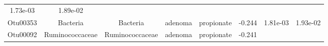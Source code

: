 \documentclass[11pt,]{article}
\begin{document}
\begin{longtable}[]{@{}cccccccc@{}}
\begin{minipage}[t]{0.08\columnwidth}
1.73e-03\strut
\end{minipage} & \begin{minipage}[t]{0.08\columnwidth}\centering\strut
1.89e-02\strut
\end{minipage}\tabularnewline
\begin{minipage}[t]{0.08\columnwidth}\centering\strut
Otu00353\strut
\end{minipage} & \begin{minipage}[t]{0.15\columnwidth}\centering\strut
Bacteria\strut
\end{minipage} & \begin{minipage}[t]{0.15\columnwidth}\centering\strut
Bacteria\strut
\end{minipage} & \begin{minipage}[t]{0.08\columnwidth}\centering\strut
adenoma\strut
\end{minipage} & \begin{minipage}[t]{0.09\columnwidth}\centering\strut
propionate\strut
\end{minipage} & \begin{minipage}[t]{0.07\columnwidth}\centering\strut
-0.244\strut
\end{minipage} & \begin{minipage}[t]{0.08\columnwidth}\centering\strut
1.81e-03\strut
\end{minipage} & \begin{minipage}[t]{0.08\columnwidth}\centering\strut
1.93e-02\strut
\end{minipage}\tabularnewline
\begin{minipage}[t]{0.08\columnwidth}\centering\strut
Otu00092\strut
\end{minipage} & \begin{minipage}[t]{0.15\columnwidth}\centering\strut
Ruminococcaceae\strut
\end{minipage} & \begin{minipage}[t]{0.15\columnwidth}\centering\strut
Ruminococcaceae\strut
\end{minipage} & \begin{minipage}[t]{0.08\columnwidth}\centering\strut
adenoma\strut
\end{minipage} & \begin{minipage}[t]{0.09\columnwidth}\centering\strut
propionate\strut
\end{minipage} & \begin{minipage}[t]{0.07\columnwidth}\centering\strut
-0.241\strut
\end{minipage} & \begin{minipage}[t]{0.08\columnwidth}\centering\strut

\end{minipage}
\end{longtable}
\end{document}
